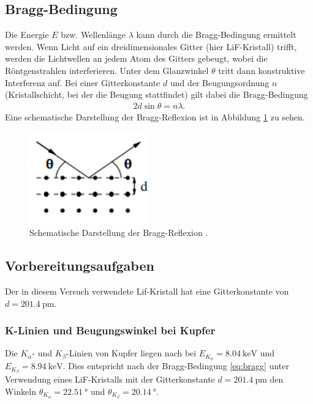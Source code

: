 \subsection{Bragg-Bedingung}
Die Energie $E$ bzw. Wellenlänge $\lambda$ kann durch die Bragg-Bedingung %
ermittelt werden.
Wenn Licht auf ein dreidimensionales Gitter (hier LiF-Kristall) trifft,
werden die Lichtwellen an jedem Atom des Gitters gebeugt, wobei die Röntgenstrahlen interferieren.
Unter dem Glanzwinkel $\theta$ tritt dann konstruktive Interferenz auf.
Bei einer Gitterkonstante $d$ und der Beugungsordnung $n$ (Kristallschicht, bei der die Beugung stattfindet) gilt dabei die Bragg-Bedingung
\begin{align}
    2 d \sin \theta = n \lambda.
    \label{eq:bragg}
\end{align}
Eine schematische Darstellung der Bragg-Reflexion ist in Abbildung \ref{fig:bragg} zu sehen.

\begin{figure}[H]
    \centering
    \includegraphics[height = 4cm]{Abbildungen/bragg.png}
    \caption[]{Schematische Darstellung der Bragg-Reflexion \cite[]{man:v602}.}
    \label{fig:bragg}
\end{figure}


\subsection{Vorbereitungsaufgaben}
Der in diesem Versuch verwendete Lif-Kristall hat eine Gitterkonstante von $d = \qty[]{201.4}{\pico\meter}$.

\subsubsection[]{K-Linien und Beugungswinkel bei Kupfer}
Die $K_\alpha$- und $K_\beta$-Linien von Kupfer liegen nach \cite[]{roentgen_leifi} bei $E_{K_\alpha} = \qty[]{8.04}{\kilo\electronvolt}$
und $E_{K_\beta} = \qty[]{8.94}{\kilo\electronvolt}$.
Dies entspricht nach der Bragg-Bedingung \eqref{eq:bragg} unter Verwendung eines LiF-Kristalls mit der Gitterkonstante $d = \qty[]{201.4}{\pico\meter}$
den Winkeln $\theta_{K_\alpha} = \qty[]{22.51}{\degree}$ und $\theta_{K_\beta} = \qty[]{20.14}{\degree}$.



